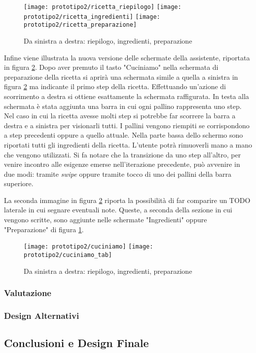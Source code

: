 \begin{figure}[ht]
  \begin{center}
    \texttt{[image: prototipo2/ricetta\_riepilogo]}
    \texttt{[image: prototipo2/ricetta\_ingredienti]}
    \texttt{[image: prototipo2/ricetta\_preparazione]}
    \caption{Da sinistra a destra: riepilogo, ingredienti, preparazione}
    \label{fig:p2_ricetta}
  \end{center}
\end{figure}

Infine viene illustrata la nuova versione delle schermate della assistente, riportata in figura \ref{fig:p2_cuciniamo}.
Dopo aver premuto il tasto "Cuciniamo" nella schermata di preparazione della ricetta si aprirà una schermata simile a quella a sinistra in figura \ref{fig:p2_cuciniamo} ma indicante il primo step della ricetta.
Effettuando un'azione di scorrimento a destra si ottiene esattamente la schermata raffigurata.
In testa alla schermata è stata aggiunta una barra in cui ogni pallino rappresenta uno step.
Nel caso in cui la ricetta avesse molti step si potrebbe far scorrere la barra a destra e a sinistra per visionarli tutti.
I pallini vengono riempiti se corrispondono a step precedenti oppure a quello attuale.
Nella parte bassa dello schermo sono riportati tutti gli ingredienti della ricetta.
L'utente potrà rimuoverli mano a mano che vengono utilizzati.
Si fa notare che la transizione da uno step all'altro, per venire incontro alle esigenze emerse nell'iterazione precedente, può avvenire in due modi: tramite \textit{swipe} oppure tramite tocco di uno dei pallini della barra superiore.

La seconda immagine in figura \ref{fig:p2_cuciniamo} riporta la possibilità di far comparire un TODO laterale in cui segnare eventuali note.
Queste, a seconda della sezione in cui vengono scritte, sono aggiunte nelle schermate "Ingredienti" oppure "Preparazione" di figura \ref{fig:p2_ricetta}.

\begin{figure}[ht]
  \begin{center}
    \texttt{[image: prototipo2/cuciniamo]}
    \texttt{[image: prototipo2/cuciniamo\_tab]}
    \caption{Da sinistra a destra: riepilogo, ingredienti, preparazione}
    \label{fig:p2_cuciniamo}
  \end{center}
\end{figure}

\subsubsection{Valutazione}











\subsubsection{Design Alternativi}

\subsection{Conclusioni e Design Finale}
